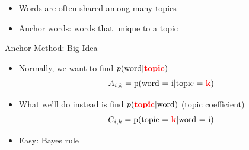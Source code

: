 \documentclass[compress]{beamer}
\newcommand{\red}[1]{{\color{red}{\bf #1}}}
\begin{document}
\begin{frame}
\begin{figure}[t!]
\label{fig:anchorwords1}
\end{figure}
\Large{
\begin{itemize}
\item Words are often shared among many topics
\item <2>\alert{Anchor words}: words that unique to a topic
\end{itemize}
}
\end{frame}


\begin{frame}{Anchor Method: Big Idea}
\begin{itemize}
  \item Normally, we want to find $p(\mbox{word}|\red{topic})$
 \begin{equation*}
      A_{i,k} = \mbox{p(word = i}|\mbox{topic = \red{k})}
    \end{equation*}
  \item What we'll do instead is find $p(\red{topic}|\mbox{word})$ (topic coefficient)
    \begin{equation*}
      C_{i,k} = \mbox{p(topic = \red{k}} | \mbox{word = i)}
    \end{equation*}
  \pause
  \item Easy: Bayes rule
\end{itemize}

\end{frame}
\end{document}

